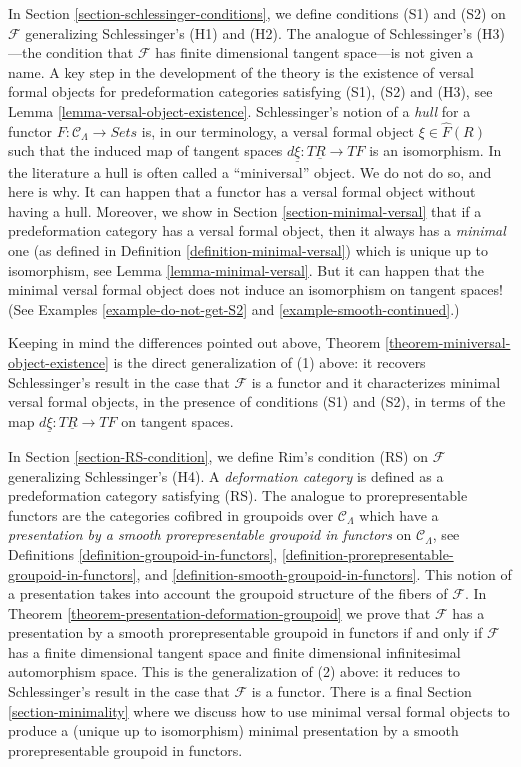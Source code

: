 \medskip\noindent
In
Section \ref{section-schlessinger-conditions},
we define conditions (S1) and (S2) on $\mathcal{F}$ generalizing
Schlessinger's (H1) and (H2). The analogue of Schlessinger's
(H3)---the condition that $\mathcal{F}$ has finite dimensional
tangent space---is not given a name.
A key step in the development of the theory is the existence of
versal formal objects for predeformation categories satisfying
(S1), (S2) and (H3), see
Lemma \ref{lemma-versal-object-existence}.
Schlessinger's notion of a {\it hull} for a functor
$F : \mathcal{C}_\Lambda \to \textit{Sets}$
is, in our terminology, a versal formal object $\xi \in \widehat{F}(R)$
such that the induced map of tangent spaces
$d\underline{\xi} : T\underline{R} \to TF$ is an isomorphism.
In the literature a hull is often called a ``miniversal'' object.
We do not do so, and here is why. It can happen that a functor has a
versal formal object without having a hull. Moreover, we show in
Section \ref{section-minimal-versal}
that if a predeformation category has a versal formal object, then
it always has a {\it minimal} one (as defined in
Definition \ref{definition-minimal-versal})
which is unique up to isomorphism, see
Lemma \ref{lemma-minimal-versal}.
But it can happen that the minimal versal formal object does not
induce an isomorphism on tangent spaces! (See
Examples \ref{example-do-not-get-S2} and
\ref{example-smooth-continued}.)

\medskip\noindent
Keeping in mind the differences pointed out above,
Theorem \ref{theorem-miniversal-object-existence}
is the direct generalization of (1) above: it recovers Schlessinger's
result in the case that $\mathcal{F}$ is a functor and it characterizes
minimal versal formal objects, in the presence of conditions
(S1) and (S2), in terms of the map $d\underline{\xi} : T\underline{R} \to TF$
on tangent spaces.

\medskip\noindent
In Section \ref{section-RS-condition},
we define Rim's condition (RS) on $\mathcal{F}$ generalizing
Schlessinger's (H4). A {\it deformation category} is defined as a
predeformation category satisfying (RS).
The analogue to prorepresentable functors are the categories
cofibred in groupoids over $\mathcal{C}_\Lambda$ which have
a {\it presentation by a smooth prorepresentable groupoid in functors}
on $\mathcal{C}_\Lambda$, see
Definitions \ref{definition-groupoid-in-functors},
\ref{definition-prorepresentable-groupoid-in-functors}, and
\ref{definition-smooth-groupoid-in-functors}.
This notion of a presentation takes into account the groupoid structure
of the fibers of $\mathcal{F}$. In
Theorem \ref{theorem-presentation-deformation-groupoid}
we prove that $\mathcal{F}$ has a presentation by a smooth prorepresentable
groupoid in functors if and only if $\mathcal{F}$ has a finite dimensional
tangent space and finite dimensional infinitesimal automorphism space.
This is the generalization of (2) above: it reduces to Schlessinger's result
in the case that $\mathcal{F}$ is a functor.
There is a final
Section \ref{section-minimality}
where we discuss how to use minimal versal formal objects
to produce a (unique up to isomorphism) minimal presentation
by a smooth prorepresentable groupoid in functors.

